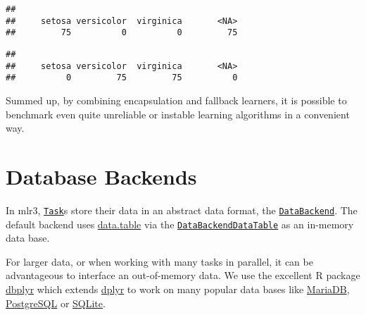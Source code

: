 \documentclass[
]{scrbook}
\newenvironment{Shaded}{\begin{snugshade}}{\end{snugshade}}
\newcommand{\AttributeTok}[1]{\textcolor[rgb]{0.77,0.63,0.00}{#1}}
\newcommand{\CommentTok}[1]{\textcolor[rgb]{0.56,0.35,0.01}{\textit{#1}}}
\newcommand{\FunctionTok}[1]{\textcolor[rgb]{0.00,0.00,0.00}{#1}}
\newcommand{\NormalTok}[1]{#1}
\newcommand{\OtherTok}[1]{\textcolor[rgb]{0.56,0.35,0.01}{#1}}
\newcommand{\SpecialCharTok}[1]{\textcolor[rgb]{0.00,0.00,0.00}{#1}}
\newcommand{\StringTok}[1]{\textcolor[rgb]{0.31,0.60,0.02}{#1}}
\renewenvironment{Shaded} {\begin{snugshade}\small} {\end{snugshade}}
\begin{document}
\begin{verbatim}
## 
##     setosa versicolor  virginica       <NA> 
##         75          0          0         75
\end{verbatim}

\begin{Shaded}
\end{Shaded}

\begin{verbatim}
## 
##     setosa versicolor  virginica       <NA> 
##          0         75         75          0
\end{verbatim}

Summed up, by combining encapsulation and fallback learners, it is possible to benchmark even quite unreliable or instable learning algorithms in a convenient way.

\hypertarget{backends}{%
\section{Database Backends}\label{backends}}

In mlr3, \href{https://mlr3.mlr-org.com/reference/Task.html}{\texttt{Task}}s store their data in an abstract data format, the \href{https://mlr3.mlr-org.com/reference/DataBackend.html}{\texttt{DataBackend}}.
The default backend uses \href{https://cran.r-project.org/package=data.table}{data.table} via the \href{https://mlr3.mlr-org.com/reference/DataBackendDataTable.html}{\texttt{DataBackendDataTable}} as an in-memory data base.

For larger data, or when working with many tasks in parallel, it can be advantageous to interface an out-of-memory data.
We use the excellent R package \href{https://cran.r-project.org/package=dbplyr}{dbplyr} which extends \href{https://cran.r-project.org/package=dplyr}{dplyr} to work on many popular data bases like \href{https://mariadb.org/}{MariaDB}, \href{https://www.postgresql.org/}{PostgreSQL} or \href{https://www.sqlite.org}{SQLite}.
\end{document}
